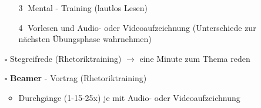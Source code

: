 \documentclass[a4paper,12pt,fleqn,parskip=half]{scrartcl}
\begin{document}
\begin{itemize}
\begin{itemize}
			\item [\textcircled{3}] Mental - Training (lautlos Lesen)
			\item [\textcircled{4}] Vorlesen und Audio- oder Videoaufzeichnung (Unterschiede zur nächsten Übungsphase wahrnehmen)
		\end{itemize}
		\item [$\square$] Stegreifrede (Rhetoriktraining) $\to$ eine Minute zum Thema reden
		\item [$\square$] \textbf{Beamer} - Vortrag (Rhetoriktraining)
		\begin{itemize} 
			\item Durchgänge (1-15-25x) je mit Audio- oder Videoaufzeichnung
		\end{itemize}
	\end{itemize}


    \printbibliography[category=cited]
\end{document}
